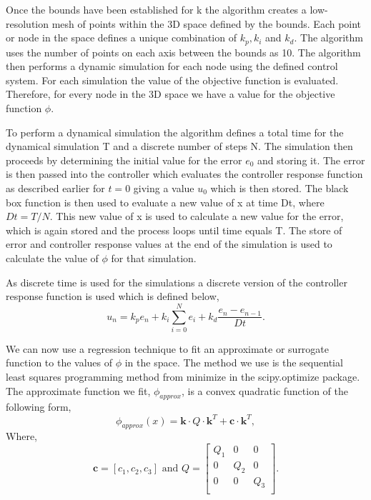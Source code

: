 \documentclass[conference]{IEEEtran}
\theoremstyle{definition}
\begin{document}
\noindent Once the bounds have been established for k the algorithm creates a low-resolution mesh of points within the 3D space defined by the bounds. Each point or node in the space defines a unique combination of $k_p, k_i$ and $k_d$. The algorithm uses the number of points on each axis between the bounds as 10. The algorithm then performs a dynamic simulation for each node using the defined control system. For each simulation the value of the objective function is evaluated. Therefore, for every node in the 3D space we have a value for the objective function $\phi$.

\noindent To perform a dynamical simulation the algorithm defines a total time for the dynamical simulation T and a discrete number of steps N. The simulation then proceeds by determining the initial value for the error $e_0$ and storing it. The error is then passed into the controller which evaluates the controller response function as described earlier for $t=0$ giving a value $u_0$ which is then stored. The black box function is then used to evaluate a new value of x at time Dt, where $Dt = T/N$. This new value of x is used to calculate a new value for the error, which is again stored and the process loops until time equals T. The store of error and controller response values at the end of the simulation is used to calculate the value of $\phi$ for that simulation.

\noindent As discrete time is used for the simulations a discrete version of the controller response function is used which is defined below,
\begin{equation}
    u_n = k_p e_n + k_i \sum_{i=0}^{N}e_i + k_d \frac{e_n - e_{n-1}}{Dt}.
\end{equation}

\noindent We can now use a regression technique to fit an approximate or surrogate function to the values of $\phi$ in the space. The method we use is the sequential least squares programming method from minimize in the scipy.optimize package. The approximate function we fit, $\phi_{approx}$, is a convex quadratic function of the following form,
\begin{equation}
    \phi_{approx}(x) = \mathbf{k} \cdot Q \cdot \mathbf{k}^T + \mathbf{c} \cdot \mathbf{k}^T,
\end{equation}
Where,
\begin{equation}
    \mathbf{c} = [c_1, c_2, c_3] \textrm{ and } Q = \begin{bmatrix}
                                                    Q_1 & 0 & 0 \\
                                                    0 & Q_2 & 0 \\
                                                    0 & 0 & Q_3 \\
                                                    \end{bmatrix}.
\end{equation}
\end{document}
